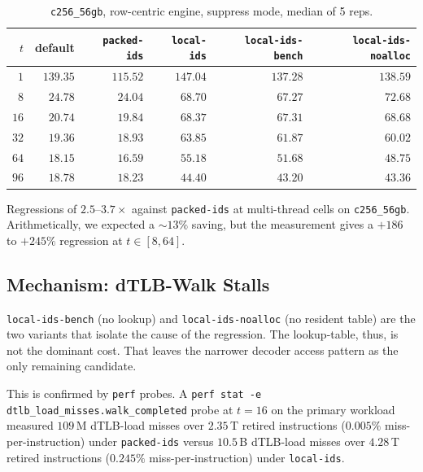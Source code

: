 \begin{table}[H]
  \centering
  \caption[Per-cluster reindexing results.]{\texttt{c256\_56gb}, row-centric engine, suppress mode, median of 5 reps.}
  \label{tab:reindex_results}
  \footnotesize
  \begin{tabular}{rrrrrr}
    \toprule
    $t$ & default & \texttt{packed-ids} & \texttt{local-ids} & \texttt{local-ids-bench} & \texttt{local-ids-noalloc} \\
    \midrule
    $1$ & $139.35$ & $115.52$ & $147.04$ & $137.28$ & $138.59$ \\
    $8$ & $24.78$ & $24.04$ & $\mathbf{68.70}$ & $\mathbf{67.27}$ & $\mathbf{72.68}$ \\
    $16$ & $20.74$ & $19.84$ & $\mathbf{68.37}$ & $\mathbf{67.31}$ & $\mathbf{68.68}$ \\
    $32$ & $19.36$ & $18.93$ & $\mathbf{63.85}$ & $\mathbf{61.87}$ & $\mathbf{60.02}$ \\
    $64$ & $18.15$ & $16.59$ & $\mathbf{55.18}$ & $\mathbf{51.68}$ & $\mathbf{48.75}$ \\
    $96$ & $18.78$ & $18.23$ & $\mathbf{44.40}$ & $\mathbf{43.20}$ & $\mathbf{43.36}$ \\
    \bottomrule
  \end{tabular}
\end{table}

Regressions of $2.5$--$3.7\times$ against \texttt{packed-ids} at multi-thread cells on \texttt{c256\_56gb}. Arithmetically, we expected a $\sim\!13\%$ saving, but the measurement gives a $+186$ to $+245\%$ regression at $t \in [8, 64]$.

\subsection{Mechanism: dTLB-Walk Stalls\label{sec:exp:reindex:mechanism}}

\texttt{local-ids-bench} (no lookup) and \texttt{local-ids-noalloc} (no resident table) are the two variants that isolate the cause of the regression. The lookup-table, thus, is not the dominant cost. That leaves the narrower decoder access pattern as the only remaining candidate. 

This is confirmed by \texttt{perf} probes. A \texttt{perf stat -e dtlb\_load\_misses.\allowbreak walk\_completed} probe at $t=16$ on the primary workload measured $109$\,M dTLB-load misses over $2.35$\,T retired instructions ($0.005\%$ miss-per-instruction) under \texttt{packed-ids} versus $10.5$\,B dTLB-load misses over $4.28$\,T retired instructions ($0.245\%$ miss-per-instruction) under \texttt{local-ids}. 

